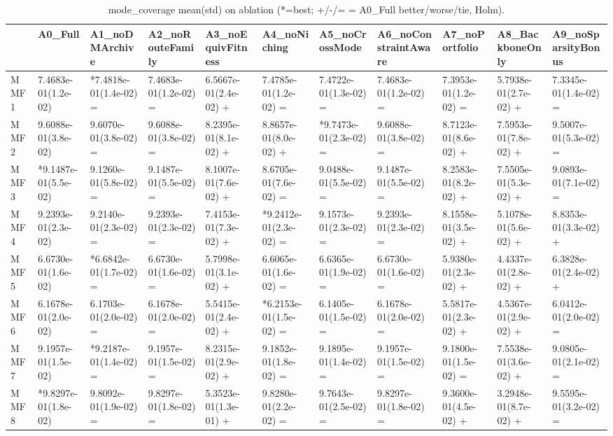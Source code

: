 \begin{table}[t]
\centering
\caption{mode_coverage mean(std) on ablation (*=best; +/-/= = A0_Full better/worse/tie, Holm).}
\label{tab:ablation_mode_coverage}
\begin{tabular}{lllllllllll}
\toprule
 & A0\_Full & A1\_noDMArchive & A2\_noRouteFamily & A3\_noEquivFitness & A4\_noNiching & A5\_noCrossMode & A6\_noConstraintAware & A7\_noPortfolio & A8\_BackboneOnly & A9\_noSparsityBonus \\
\midrule
MMF1 & 7.4683e-01(1.2e-02) & *7.4818e-01(1.4e-02) = & 7.4683e-01(1.2e-02) = & 6.5667e-01(2.4e-02) + & 7.4785e-01(1.2e-02) = & 7.4722e-01(1.3e-02) = & 7.4683e-01(1.2e-02) = & 7.3953e-01(1.2e-02) = & 5.7938e-01(2.7e-02) + & 7.3345e-01(1.4e-02) = \\
MMF2 & 9.6088e-01(3.8e-02) & 9.6070e-01(3.8e-02) = & 9.6088e-01(3.8e-02) = & 8.2395e-01(8.1e-02) + & 8.8657e-01(8.0e-02) + & *9.7473e-01(2.3e-02) = & 9.6088e-01(3.8e-02) = & 8.7123e-01(8.6e-02) + & 7.5953e-01(7.8e-02) + & 9.5007e-01(5.3e-02) = \\
MMF3 & *9.1487e-01(5.5e-02) & 9.1260e-01(5.8e-02) = & 9.1487e-01(5.5e-02) = & 8.1007e-01(7.6e-02) + & 8.6705e-01(7.6e-02) = & 9.0488e-01(5.5e-02) = & 9.1487e-01(5.5e-02) = & 8.2583e-01(8.2e-02) + & 7.5505e-01(5.3e-02) + & 9.0893e-01(7.1e-02) = \\
MMF4 & 9.2393e-01(2.3e-02) & 9.2140e-01(2.3e-02) = & 9.2393e-01(2.3e-02) = & 7.4153e-01(7.3e-02) + & *9.2412e-01(2.3e-02) = & 9.1573e-01(2.3e-02) = & 9.2393e-01(2.3e-02) = & 8.1558e-01(3.5e-02) + & 5.1078e-01(5.6e-02) + & 8.8353e-01(3.3e-02) + \\
MMF5 & 6.6730e-01(1.6e-02) & *6.6842e-01(1.7e-02) = & 6.6730e-01(1.6e-02) = & 5.7998e-01(3.1e-02) + & 6.6065e-01(1.6e-02) = & 6.6365e-01(1.9e-02) = & 6.6730e-01(1.6e-02) = & 5.9380e-01(2.3e-02) + & 4.4337e-01(2.8e-02) + & 6.3828e-01(2.4e-02) + \\
MMF6 & 6.1678e-01(2.0e-02) & 6.1703e-01(2.0e-02) = & 6.1678e-01(2.0e-02) = & 5.5415e-01(2.4e-02) + & *6.2153e-01(1.5e-02) = & 6.1405e-01(1.5e-02) = & 6.1678e-01(2.0e-02) = & 5.5817e-01(2.3e-02) + & 4.5367e-01(2.9e-02) + & 6.0412e-01(2.0e-02) = \\
MMF7 & 9.1957e-01(1.5e-02) & *9.2187e-01(1.4e-02) = & 9.1957e-01(1.5e-02) = & 8.2315e-01(2.9e-02) + & 9.1852e-01(1.8e-02) = & 9.1895e-01(1.4e-02) = & 9.1957e-01(1.5e-02) = & 9.1800e-01(1.5e-02) = & 7.5538e-01(3.6e-02) + & 9.0805e-01(2.1e-02) = \\
MMF8 & *9.8297e-01(1.8e-02) & 9.8092e-01(1.9e-02) = & 9.8297e-01(1.8e-02) = & 5.3523e-01(1.3e-01) + & 9.8280e-01(2.2e-02) = & 9.7643e-01(2.5e-02) = & 9.8297e-01(1.8e-02) = & 9.3600e-01(4.5e-02) + & 3.2948e-01(8.7e-02) + & 9.5595e-01(3.2e-02) = \\
\bottomrule
\end{tabular}
\end{table}
